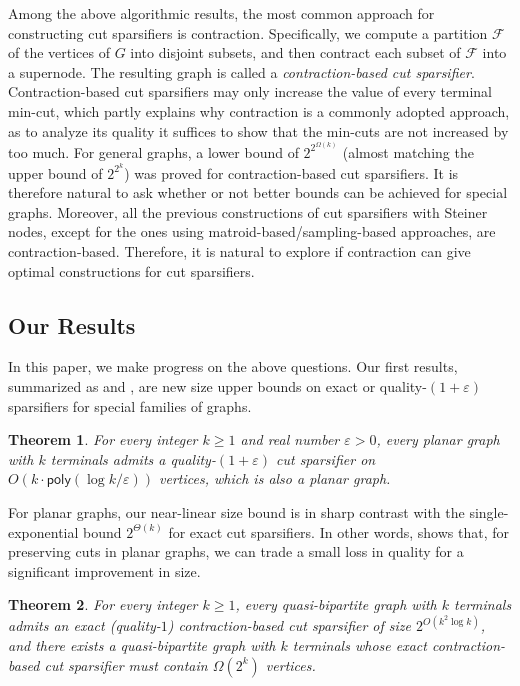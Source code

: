 \documentclass[11pt]{article}
\newtheorem{theorem}{Theorem}
\theoremstyle{definition}
\newcommand{\fset}{{\mathcal{F}}}
\newcommand{\eps}{{\varepsilon}}
\newcommand{\poly}{\mathsf{poly}}
\begin{document}
Among the above algorithmic results, the most common approach for constructing cut sparsifiers is contraction. Specifically, we compute a partition $\fset$ of the vertices of $G$ into disjoint subsets, and then contract each subset of $\fset$ into a supernode.
The resulting graph is called a \emph{contraction-based cut sparsifier}.
Contraction-based cut sparsifiers may only increase the value of every terminal min-cut, which partly explains why contraction is a commonly adopted approach, as to analyze its quality it suffices to show that the min-cuts are not increased by too much.
For general graphs, a lower bound of $2^{2^{\Omega(k)}}$ (almost matching the upper bound of $2^{2^k}$) was proved \cite{karpov2017exponential} for contraction-based cut sparsifiers. It is therefore natural to ask whether or not better bounds can be achieved for special graphs.
Moreover, all the previous constructions of cut sparsifiers with Steiner nodes, except for the ones using matroid-based/sampling-based approaches, are contraction-based.
Therefore, it is natural to explore if contraction can give optimal constructions for cut sparsifiers.


\subsection{Our Results}


In this paper, we make progress on the above questions. Our first results, summarized as  and , are new size upper bounds on exact or quality-$(1+\eps)$ sparsifiers for special families of graphs.

\begin{theorem}
\label{main: upper}
For every integer $k\ge 1$ and real number $\eps>0$, every planar graph with $k$ terminals admits a quality-$(1+\eps)$ cut sparsifier on $O(k\cdot\poly(\log k/\eps))$ vertices, which is also a planar graph.
\end{theorem}

For planar graphs, our near-linear size bound is in sharp contrast with the single-exponential bound $2^{\Theta(k)}$ \cite{krauthgamer2013mimicking,krauthgamer2017refined,karpov2017exponential} for exact cut sparsifiers. In other words,  shows that, for preserving cuts in planar graphs, we can trade a small loss in quality for a significant improvement in size.

\begin{theorem}
	\label{quasi_1}
For every integer $k\ge 1$, every quasi-bipartite graph with $k$ terminals admits an exact (quality-$1$) contraction-based cut sparsifier of size $2^{O(k^2\log k)}$, and there exists a quasi-bipartite graph with $k$ terminals whose exact contraction-based cut sparsifier must contain $\Omega(2^k)$ vertices.
\end{theorem}
\end{document}
